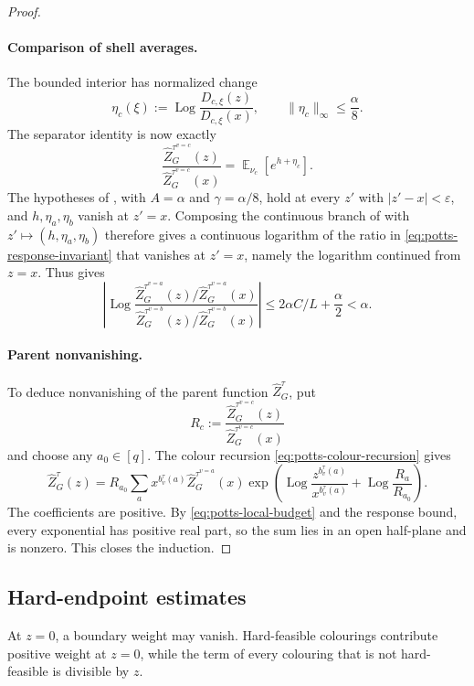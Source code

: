 \documentclass[11pt,reqno]{article}
\theoremstyle{plain}
\theoremstyle{definition}
\theoremstyle{remark}
\theoremstyle{definition}
\theoremstyle{remark}
\newcommand{\eps}{\varepsilon}
\newcommand{\Log}{\operatorname{Log}}          %
\DeclareMathOperator{\E}{\mathbb{E}}
\newcommand{\colours}{[q]}                        %
\newcommand{\bcount}{b}
\newcommand{\nZpin}[2]{\widehat Z_{#1}^{#2}}
\begin{document}
\begin{proof}
\paragraph{Comparison of shell averages.}
The bounded interior has normalized change
\[
  \eta_c(\xi):=\Log\frac{D_{c,\xi}(z)}{D_{c,\xi}(x)},
  \qquad
  \|\eta_c\|_\infty\le\frac\alpha8.
\]
The separator identity is now exactly
\begin{equation}\label{eq:potts-separator-expectation}
  \frac{\nZpin{G}{\tau^{v=c}}(z)}
       {\nZpin{G}{\tau^{v=c}}(x)}
  =\E_{\nu_c}[e^{h+\eta_c}].
\end{equation}
The hypotheses of , with \(A=\alpha\) and
\(\gamma=\alpha/8\), hold at every \(z'\) with \(|z'-x|<\eps\), and
\(h,\eta_a,\eta_b\) vanish at \(z'=x\).  Composing the continuous branch
of  with \(z'\mapsto(h,\eta_a,\eta_b)\) therefore gives a
continuous logarithm of the ratio in \eqref{eq:potts-response-invariant}
that vanishes at \(z'=x\), namely the logarithm continued from \(z=x\).
Thus  gives
\[
  \left|\Log
  \frac{\nZpin{G}{\tau^{v=a}}(z)/\nZpin{G}{\tau^{v=a}}(x)}
       {\nZpin{G}{\tau^{v=b}}(z)/\nZpin{G}{\tau^{v=b}}(x)}\right|
  \le2\alpha C/L+\frac\alpha2<\alpha.
\]

\paragraph{Parent nonvanishing.}
To deduce nonvanishing of the parent function \(\nZpin{G}{\tau}\), put
\[
  R_c:=\frac{\nZpin{G}{\tau^{v=c}}(z)}
             {\nZpin{G}{\tau^{v=c}}(x)}
\]
and choose any \(a_0\in\colours\).  The colour recursion
\eqref{eq:potts-colour-recursion} gives
\[
  \nZpin{G}{\tau}(z)
  =R_{a_0}
   \sum_a x^{\bcount_v^\tau(a)}\nZpin{G}{\tau^{v=a}}(x)
   \exp\!\left(
      \Log\frac{z^{\bcount_v^\tau(a)}}{x^{\bcount_v^\tau(a)}}
      +\Log\frac{R_a}{R_{a_0}}\right).
\]
The coefficients are positive.  By \eqref{eq:potts-local-budget} and the
response bound, every exponential has positive real part,
so the sum lies in an open half-plane and is nonzero.  This closes the
induction.
\end{proof}

\subsection{Hard-endpoint estimates}
\label{sec:hard-endpoint}

At \(z=0\), a boundary weight may vanish.  Hard-feasible colourings contribute
positive weight at \(z=0\), while the term of every colouring that is not
hard-feasible is divisible by \(z\).
\end{document}
